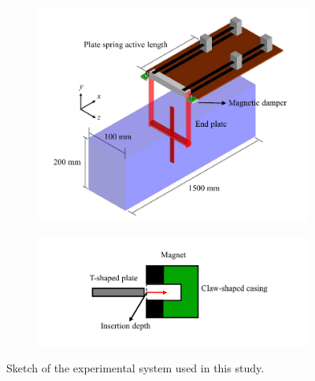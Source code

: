 \documentclass[oneside]{utmthesis}
\begin{document}
\begin{figure}
  \centering
  \begin{subfigure}[h]{1\textwidth}
    \includegraphics[width=\textwidth]{figs/rigSketch}
    \caption{}
    \label{fig:rigSketch}
  \end{subfigure}

  \begin{subfigure}[h]{1\textwidth}
    \includegraphics[width=\textwidth]{figs/damperSketch}
    \caption{}
    \label{fig:damperSketch}
  \end{subfigure}

  \caption{Sketch of the experimental system used in this study.} \label{fig:experimentalSetup}
\end{figure}
\end{document}
